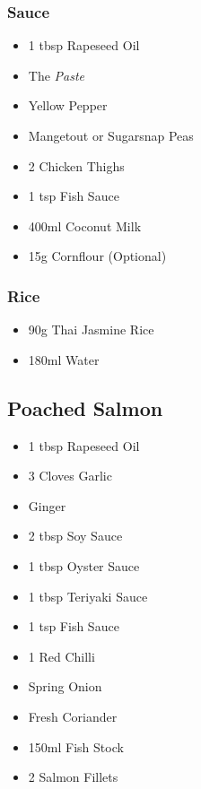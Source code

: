 \documentclass[11pt, english]{article}
\begin{document}
		\subsubsection*{Sauce}

	\begin{itemize}
        \setlength\itemsep{0cm}
                \item 1 tbsp Rapeseed Oil
                \item The \textit{Paste}
                \item Yellow Pepper
		\item Mangetout or Sugarsnap Peas
                \item 2 Chicken Thighs
                \item 1 tsp Fish Sauce
                \item 400ml Coconut Milk
		\item 15g Cornflour (Optional)
        \end{itemize}

		\subsubsection*{Rice}

	\begin{itemize}
        \setlength\itemsep{0cm}
                \item 90g Thai Jasmine Rice
		\item 180ml Water
        \end{itemize}

\newpage

	\subsection{Poached Salmon}

	\begin{itemize}
        \setlength\itemsep{0cm}
                \item 1 tbsp Rapeseed Oil
		\item 3 Cloves Garlic
		\item Ginger
		\item 2 tbsp Soy Sauce
		\item 1 tbsp Oyster Sauce
		\item 1 tbsp Teriyaki Sauce
		\item 1 tsp Fish Sauce
		\item 1 Red Chilli
		\item Spring Onion
		\item Fresh Coriander
		\item 150ml Fish Stock
		\item 2 Salmon Fillets
        \end{itemize}
\end{document}

